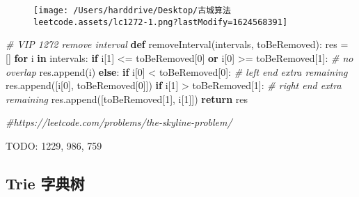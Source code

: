 \documentclass[
]{article}
\newenvironment{Shaded}{}{}
\newcommand{\CommentTok}[1]{\textcolor[rgb]{0.38,0.63,0.69}{\textit{#1}}}
\newcommand{\ControlFlowTok}[1]{\textcolor[rgb]{0.00,0.44,0.13}{\textbf{#1}}}
\newcommand{\DecValTok}[1]{\textcolor[rgb]{0.25,0.63,0.44}{#1}}
\newcommand{\KeywordTok}[1]{\textcolor[rgb]{0.00,0.44,0.13}{\textbf{#1}}}
\newcommand{\NormalTok}[1]{#1}
\newcommand{\OperatorTok}[1]{\textcolor[rgb]{0.40,0.40,0.40}{#1}}
\begin{document}
\begin{figure}
\centering
\texttt{[image: /Users/harddrive/Desktop/古城算法leetcode.assets/lc1272-1.png?lastModify=1624568391]}
\caption{}
\end{figure}

\begin{Shaded}
\begin{Highlighting}[]
\CommentTok{\# VIP 1272 remove interval}
\KeywordTok{def}\NormalTok{ removeInterval(intervals, toBeRemoved):}
\NormalTok{  res }\OperatorTok{=}\NormalTok{ []}
  \ControlFlowTok{for}\NormalTok{ i }\KeywordTok{in}\NormalTok{ intervals:}
    \ControlFlowTok{if}\NormalTok{ i[}\DecValTok{1}\NormalTok{] }\OperatorTok{\textless{}=}\NormalTok{ toBeRemoved[}\DecValTok{0}\NormalTok{] }\KeywordTok{or}\NormalTok{ i[}\DecValTok{0}\NormalTok{] }\OperatorTok{\textgreater{}=}\NormalTok{ toBeRemoved[}\DecValTok{1}\NormalTok{]:  }\CommentTok{\# no overlap}
\NormalTok{      res.append(i)}
    \ControlFlowTok{else}\NormalTok{:}
      \ControlFlowTok{if}\NormalTok{ i[}\DecValTok{0}\NormalTok{] }\OperatorTok{\textless{}}\NormalTok{ toBeRemoved[}\DecValTok{0}\NormalTok{]:  }\CommentTok{\# left end extra remaining}
\NormalTok{        res.append([i[}\DecValTok{0}\NormalTok{], toBeRemoved[}\DecValTok{0}\NormalTok{]])}
      \ControlFlowTok{if}\NormalTok{ i[}\DecValTok{1}\NormalTok{] }\OperatorTok{\textgreater{}}\NormalTok{ toBeRemoved[}\DecValTok{1}\NormalTok{]:  }\CommentTok{\# right end extra remaining}
\NormalTok{        res.append([toBeRemoved[}\DecValTok{1}\NormalTok{], i[}\DecValTok{1}\NormalTok{]])}
  \ControlFlowTok{return}\NormalTok{ res}
\end{Highlighting}
\end{Shaded}

\begin{Shaded}
\begin{Highlighting}[]
\CommentTok{\#https://leetcode.com/problems/the{-}skyline{-}problem/}
\end{Highlighting}
\end{Shaded}

TODO: 1229, 986, 759

\hypertarget{trie-ux5b57ux5178ux6811}{%
\subsection{Trie 字典树}\label{trie-ux5b57ux5178ux6811}}
\end{document}
